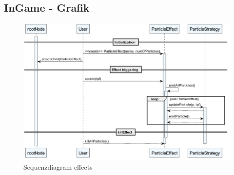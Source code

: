 \subsection{InGame - Grafik}

\begin{figure}[htbp]
    \centering
    \includegraphics[width=1\linewidth]{InGameGrafik/Bilder/particleEmitterSequence.png}
    \caption{Sequenzdiagram effects}
\end{figure}